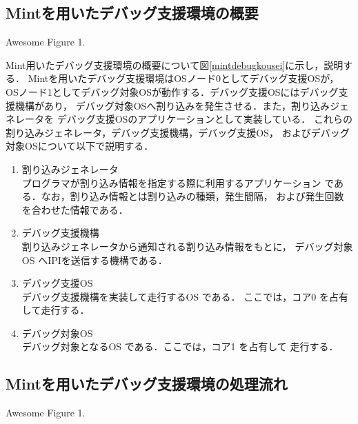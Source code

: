 \documentclass[tanilab-enum]{graduate}
\begin{document}
    \subsection{Mintを用いたデバッグ支援環境の概要}
    {Awesome Figure 1.}

    Mint用いたデバッグ支援環境の概要について図\ref{mintdebugkousei}に示し，説明する．
    Mintを用いたデバッグ支援環境はOSノード0としてデバッグ支援OSが，
    OSノード1としてデバッグ対象OSが動作する．デバッグ支援OSにはデバッグ支援機構があり，
    デバッグ対象OSへ割り込みを発生させる．また，割り込みジェネレータを
    デバッグ支援OSのアプリケーションとして実装している．
    これらの割り込みジェネレータ，デバッグ支援機構，デバッグ支援OS，
    およびデバッグ対象OSについて以下で説明する．
    \begin{enumerate}
        \item 割り込みジェネレータ\\
            プログラマが割り込み情報を指定する際に利用するアプリケーション
            である．なお，割り込み情報とは割り込みの種類，発生間隔，
            および発生回数を合わせた情報である．
        \item デバッグ支援機構\\
            割り込みジェネレータから通知される割り込み情報をもとに，
            デバッグ対象OS へIPIを送信する機構である．
        \item デバッグ支援OS\\
            デバッグ支援機構を実装して走行するOS である．
            ここでは，コア0 を占有して走行する．
        \item デバッグ対象OS\\
            デバッグ対象となるOS である．ここでは，コア1 を占有して
            走行する．
    \end{enumerate}
    \subsection{Mintを用いたデバッグ支援環境の処理流れ}
    {Awesome Figure 1.}
\end{document}
